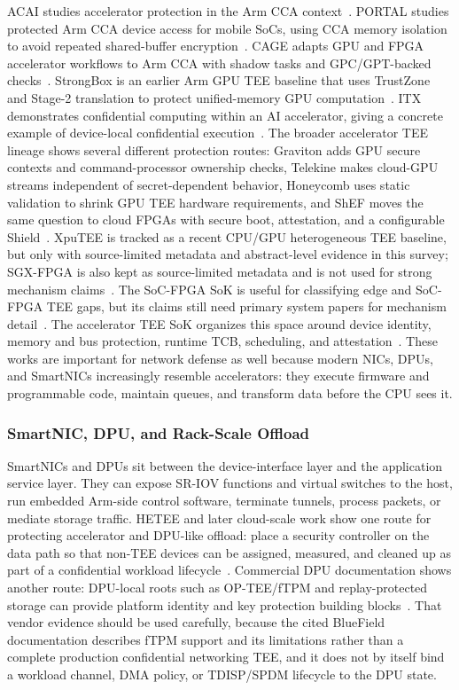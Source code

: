 ACAI studies accelerator protection in the Arm CCA context~\cite{acai2023}.
PORTAL studies protected Arm CCA device access for mobile SoCs, using CCA
memory isolation to avoid repeated shared-buffer encryption~\cite{sang2025portal}.
CAGE adapts GPU and FPGA accelerator workflows to Arm CCA with shadow tasks and
GPC/GPT-backed checks~\cite{wang2026cage}. StrongBox is an earlier Arm GPU TEE
baseline that uses TrustZone and Stage-2 translation to protect unified-memory
GPU computation~\cite{deng2022strongbox}.
ITX demonstrates confidential computing within an AI accelerator, giving a
concrete example of device-local confidential execution~\cite{vaswani2023itx}.
The broader accelerator TEE lineage shows several different protection routes:
Graviton adds GPU secure contexts and command-processor ownership checks,
Telekine makes cloud-GPU streams independent of secret-dependent behavior,
Honeycomb uses static validation to shrink GPU TEE hardware requirements, and
ShEF moves the same question to cloud FPGAs with secure boot, attestation, and
a configurable Shield~\cite{volos2018graviton,hunt2020telekine,mai2023honeycomb,zhao2022shef}.
XpuTEE is tracked as a recent CPU/GPU heterogeneous TEE baseline, but only with
source-limited metadata and abstract-level evidence in this survey; SGX-FPGA is
also kept as source-limited metadata and is not used for strong mechanism
claims~\cite{fan2025xputee,xia2021sgxfpga}. The SoC-FPGA SoK is useful for
classifying edge and SoC-FPGA TEE gaps, but its claims still need primary
system papers for mechanism detail~\cite{perkins2024socsok}.
The accelerator TEE SoK organizes this space around device identity, memory and
bus protection, runtime TCB, scheduling, and attestation~\cite{sok-tee}. These
works are important for network defense as well because modern NICs, DPUs, and
SmartNICs increasingly resemble accelerators: they execute firmware and
programmable code, maintain queues, and transform data before the CPU sees it.

\subsubsection{SmartNIC, DPU, and Rack-Scale Offload}

SmartNICs and DPUs sit between the device-interface layer and the application
service layer. They can expose SR-IOV functions and virtual switches to the
host, run embedded Arm-side control software, terminate tunnels, process
packets, or mediate storage traffic. HETEE and later cloud-scale work show one
route for protecting accelerator and DPU-like offload: place a security
controller on the data path so that non-TEE devices can be assigned, measured,
and cleaned up as part of a confidential workload lifecycle~\cite{zhu2020hetee,dhar2024cloudscale}.
Commercial DPU documentation shows another route: DPU-local roots such as
OP-TEE/fTPM and replay-protected storage can provide platform identity and key
protection building blocks~\cite{nvidia_bluefield_operation_2025}. That vendor
evidence should be used carefully, because the cited BlueField documentation
describes fTPM support and its limitations rather than a complete production
confidential networking TEE, and it does not by itself bind a workload channel,
DMA policy, or TDISP/SPDM lifecycle to the DPU state.

